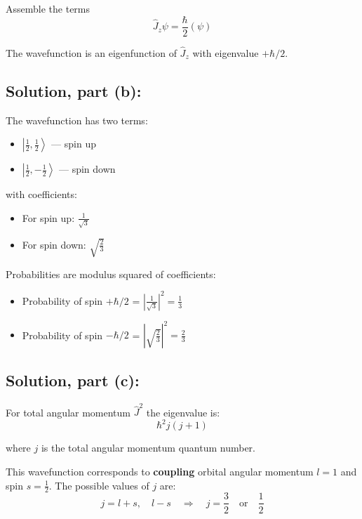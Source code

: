 \documentclass[12pt]{article}
\begin{document}
        Assemble the terms
        \[
        \hat{J}_z \psi = \frac{\hbar}{2} \left( \psi \right)
        \]

        The wavefunction is an eigenfunction of \( \hat{J}_z \) with eigenvalue \( +\hbar/2 \).


    \subsection{Solution, part (b):}

        The wavefunction has two terms:
        \begin{itemize}
            \item \( \left| \frac{1}{2}, \frac{1}{2} \right\rangle \) — spin up
            \item \( \left| \frac{1}{2}, -\frac{1}{2} \right\rangle \) — spin down
        \end{itemize}

        with coefficients:

        \begin{itemize}
            \item For spin up: \( \frac{1}{\sqrt{3}} \)
            \item For spin down: \( \sqrt{\frac{2}{3}} \)
        \end{itemize}

        Probabilities are modulus squared of coefficients:
        \begin{itemize}
            \item Probability of spin \( +\hbar/2 \) = \( \left| \frac{1}{\sqrt{3}} \right|^2 = \frac{1}{3} \)
            \item Probability of spin \( -\hbar/2 \) = \( \left| \sqrt{\frac{2}{3}} \right|^2 = \frac{2}{3} \)
        \end{itemize}

    \subsection{Solution, part (c):}
        For total angular momentum $\hat{J}^2$ the eigenvalue is:
        \[
            \hbar^2 j(j+1)
        \]

        where \( j \) is the total angular momentum quantum number.

        This wavefunction corresponds to \textbf{coupling} orbital angular momentum \( l=1 \) and spin \( s=\frac{1}{2} \). The possible values of \( j \) are:
        \[
            j = l+s, \quad l-s \quad \Rightarrow \quad j = \frac{3}{2} \quad \text{or} \quad \frac{1}{2}
        \]
\end{document}
